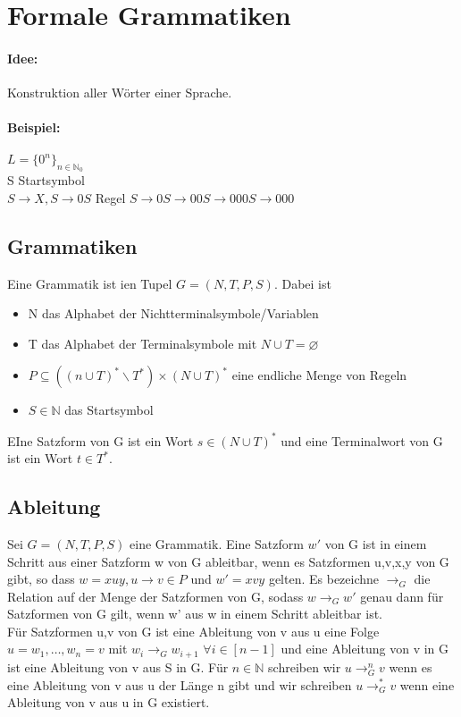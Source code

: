 \section{Formale Grammatiken}
\fancyhead[R]{}
\paragraph*{Idee:} Konstruktion aller Wörter einer Sprache.
\paragraph*{Beispiel:} \(L=\{0^n\}_{n\in\mathbb{N}_0}\)\\
S Startsymbol\\
\(S\to X,S\to 0S\) Regel 
\(S\to 0S\to 00S\to 000S\to 000\)
\subsection{Grammatiken}
    Eine Grammatik ist ien Tupel \(G=(N,T,P,S)\). Dabei ist 
    \begin{itemize}
        \item N das Alphabet der Nichtterminalsymbole/Variablen 
        \item T das Alphabet der Terminalsymbole mit \(N\cup T=\varnothing \)
        \item \(P\subseteq((n\cup T)^*\backslash T^*)\times (N\cup T)^*\) eine endliche Menge von Regeln
        \item \(S\in\mathbb{N}\) das Startsymbol
    \end{itemize}
    EIne Satzform von G ist ein Wort \(s\in(N\cup T)^*\) und eine Terminalwort von G ist ein Wort \(t\in T^*\).
\subsection{Ableitung}
    Sei \(G=(N,T,P,S)\) eine Grammatik. Eine Satzform \(w'\) von G ist in einem Schritt aus einer Satzform w von G ableitbar, wenn es Satzformen u,v,x,y von G gibt, so dass \(w=xuy,u\to v\in P\) und \(w'=xvy\) gelten. Es bezeichne \(\to_G\) die Relation auf der Menge der Satzformen von G, sodass \(w\to_Gw'\) genau dann für Satzformen von G gilt, wenn w' aus w in einem Schritt ableitbar ist.\\
    Für Satzformen u,v von G ist eine Ableitung von v aus u eine Folge \(u=w_1,\dots,w_n=v\) mit \(w_i\to_Gw_{i+1}\) \(\forall i\in[n-1]\) und eine Ableitung von v in G ist eine Ableitung von v aus S in G. Für \(n\in\mathbb{N}\) schreiben wir \(u\to^n_Gv\) wenn es eine Ableitung von v aus u der Länge n gibt und wir schreiben \(u\to^*_Gv\) wenn eine Ableitung von v aus u in G existiert.
